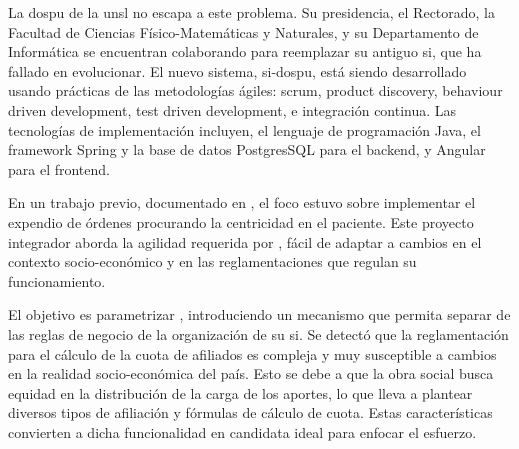 

La \acrfull{dospu} de la \acrfull{unsl} no escapa a este problema. 
Su presidencia, el Rectorado, la Facultad de Ciencias Físico-Matemáticas y Naturales, y su Departamento de Informática se encuentran colaborando para reemplazar su antiguo \acrshort{si}, que ha fallado en evolucionar. 
%
El nuevo sistema, \acrshort{si}-\acrshort{dospu}, está siendo desarrollado usando prácticas de las metodologías ágiles: scrum, product discovery, behaviour driven development, test driven development, e integración continua.
%
Las tecnologías de implementación incluyen, el lenguaje de programación Java, el framework Spring y la base de datos PostgresSQL para el backend, y Angular para el frontend. 

En un trabajo previo, documentado en \cite{Vela2024}, el foco estuvo sobre implementar el expendio de órdenes procurando la centricidad en el paciente.
%
Este proyecto integrador aborda la agilidad requerida por {\SIOSU}, fácil de adaptar a cambios en el contexto socio-económico y en las reglamentaciones que regulan su funcionamiento.



El objetivo es parametrizar {\SIDOSPU}, introduciendo un mecanismo que permita separar de las reglas de negocio de la organización de su \acrshort{si}. 
Se detectó que la reglamentación para el cálculo de la cuota de afiliados es compleja y muy susceptible a cambios en la realidad socio-económica del país. 
Esto se debe a que la obra social busca equidad en la distribución de la carga de los aportes, lo que lleva a plantear diversos tipos de afiliación y fórmulas de cálculo de cuota. 
Estas características convierten a dicha funcionalidad en candidata ideal para enfocar el esfuerzo.

